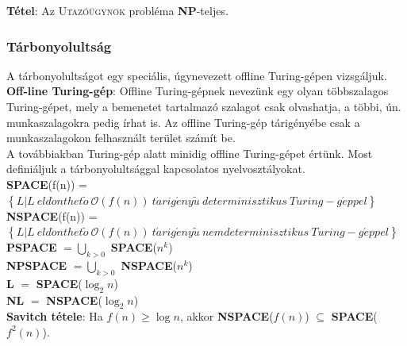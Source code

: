 \documentclass[margin=0px]{article}
\begin{document}
\noindent \textbf{Tétel}: Az \textsc{Utazóügynök} probléma \textbf{NP}-teljes.

\subsubsection{Tárbonyolultság}
A tárbonyolultságot egy speciális, úgynevezett offline Turing-gépen vizsgáljuk.\\

\noindent \textbf{Off-line Turing-gép}: Offline Turing-gépnek nevezünk egy olyan többszalagos Turing-gépet,
mely a bemenetet tartalmazó szalagot csak olvashatja, a többi, ún. munkaszalagokra
pedig írhat is. Az offline Turing-gép tárigényébe csak a munkaszalagokon
felhasznált terület számít be.\\

A továbbiakban Turing-gép alatt minidig offline Turing-gépet értünk. Most
definiáljuk a tárbonyolultsággal kapcsolatos nyelvosztályokat.\\

\noindent \textbf{SPACE}(f(n)) = $\left\{L|L \ eld\ddot{o}nthet\tilde{o} \ \mathcal{O}(f(n)) \ t\acute{a}rig\acute{e}ny\tilde{u} \
    determinisztikus \ Turing-g\acute{e}ppel \right\}$\\

\noindent \textbf{NSPACE}(f(n)) = $\left\{L|L \ eld\ddot{o}nthet\tilde{o} \ \mathcal{O}(f(n)) \ t\acute{a}rig\acute{e}ny\tilde{u} \
    nemdeterminisztikus \ Turing-g\acute{e}ppel \right\}$\\

\noindent \textbf{PSPACE} $=\bigcup_{k > 0}$ \textbf{SPACE}($n^{k}$)\\

\noindent \textbf{NPSPACE} $=\bigcup_{k > 0}$ \textbf{NSPACE}($n^{k}$)\\

\noindent \textbf{L} $=$ \textbf{SPACE}($\log_{2} n$) \\

\noindent \textbf{NL} $=$ \textbf{NSPACE}($\log_{2} n$) \\

\noindent \textbf{Savitch tétele}: Ha $f(n) \geq \log n$, akkor \textbf{NSPACE}($f(n)$) $\subseteq$ \textbf{SPACE}($f^{2}(n)$).
\end{document}
